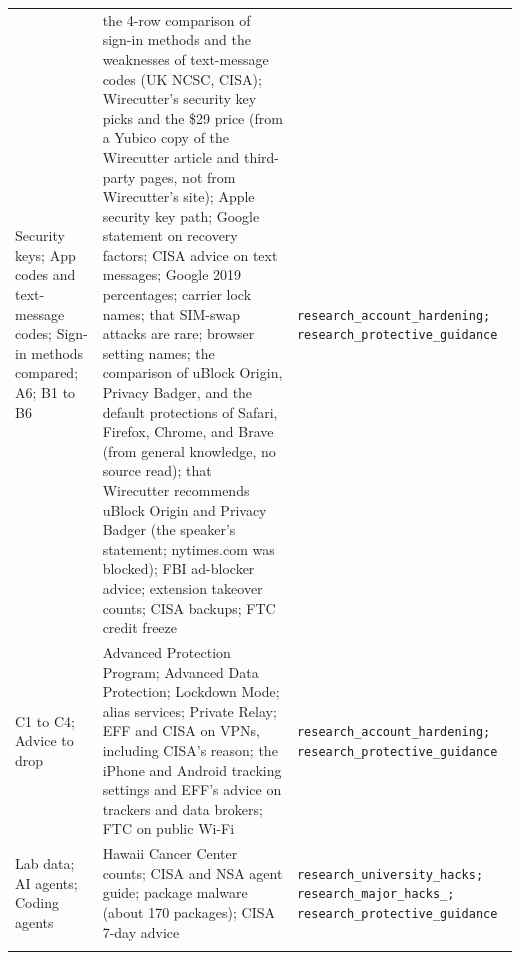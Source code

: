 \documentclass[10pt]{article}
\begin{document}
\begin{longtable}{L{0.22\textwidth}L{0.45\textwidth}L{0.25\textwidth}}
Security keys; App codes and text-message codes; Sign-in methods compared; A6; B1 to B6 & the 4-row comparison of sign-in methods and the weaknesses of text-message codes (UK NCSC, CISA); Wirecutter's security key picks and the \$29 price (from a Yubico copy of the Wirecutter article and third-party pages, not from Wirecutter's site); Apple security key path; Google statement on recovery factors; CISA advice on text messages; Google 2019 percentages; carrier lock names; that SIM-swap attacks are rare; browser setting names; the comparison of uBlock Origin, Privacy Badger, and the default protections of Safari, Firefox, Chrome, and Brave (from general knowledge, no source read); that Wirecutter recommends uBlock Origin and Privacy Badger (the speaker's statement; nytimes.com was blocked); FBI ad-blocker advice; extension takeover counts; CISA backups; FTC credit freeze & \texttt{research\_\allowbreak account\_\allowbreak hardening; research\_\allowbreak protective\_\allowbreak guidance}\\\addlinespace
C1 to C4; Advice to drop & Advanced Protection Program; Advanced Data Protection; Lockdown Mode; alias services; Private Relay; EFF and CISA on VPNs, including CISA's reason; the iPhone and Android tracking settings and EFF's advice on trackers and data brokers; FTC on public Wi-Fi & \texttt{research\_\allowbreak account\_\allowbreak hardening; research\_\allowbreak protective\_\allowbreak guidance}\\\addlinespace
Lab data; AI agents; Coding agents & Hawaii Cancer Center counts; CISA and NSA agent guide; package malware (about 170 packages); CISA 7-day advice & \texttt{research\_\allowbreak university\_\allowbreak hacks; research\_\allowbreak major\_\allowbreak hacks\_; research\_\allowbreak protective\_\allowbreak guidance}\\\addlinespace
\bottomrule
\end{longtable}
\end{document}
